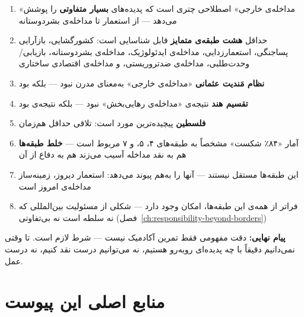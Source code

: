 \begin{tcolorbox}[mybox, title={خلاصه‌ی این پیوست}]
\begin{enumerate}
\item «مداخله‌ی خارجی» اصطلاحی چتری است که پدیده‌های
  \textbf{بسیار متفاوتی} را پوشش می‌دهد — از استعمار تا مداخله‌ی
  بشردوستانه

\item حداقل \textbf{هشت طبقه‌ی متمایز} قابل شناسایی است:
  کشورگشایی، بازآرایی پساجنگی، استعمارزدایی، مداخله‌ی ایدئولوژیک،
  مداخله‌ی بشردوستانه، بازیابی/وحدت‌طلبی، مداخله‌ی ضدتروریستی،
  و مداخله‌ی اقتصادی ساختاری

\item \textbf{نظام مَندیت عثمانی} «مداخله‌ی خارجی» به‌معنای مدرن نبود
  — بلکه  بود

\item \textbf{تقسیم هند} نتیجه‌ی «مداخله‌ی رهایی‌بخش» نبود — بلکه
  نتیجه‌ی  بود

\item \textbf{فلسطین} پیچیده‌ترین مورد است: تلاقی حداقل
   هم‌زمان

\item آمار «۸۴٪ شکست» مشخصاً به طبقه‌های ۴، ۵، و ۷ مربوط است —
  \textbf{خلط طبقه‌ها} هم به نقد مداخله آسیب می‌زند هم به دفاع از آن

\item این طبقه‌ها مستقل نیستند —  آنها را
  به‌هم پیوند می‌دهد: استعمار دیروز، زمینه‌ساز مداخله‌ی امروز است

\item فراتر از همه‌ی این طبقه‌ها، امکان 
  وجود دارد — شکلی از مسئولیت بین‌المللی که نه سلطه است نه بی‌تفاوتی
  (فصل~\ref{ch:responsibility-beyond-borders})
\end{enumerate}

\textbf{پیام نهایی:} دقت مفهومی فقط تمرین آکادمیک نیست — شرط لازم
 است. تا وقتی نمی‌دانیم دقیقاً با چه
پدیده‌ای روبه‌رو هستیم، نه می‌توانیم درست نقد کنیم، نه درست عمل.
\end{tcolorbox}

\section*{منابع اصلی این پیوست}

